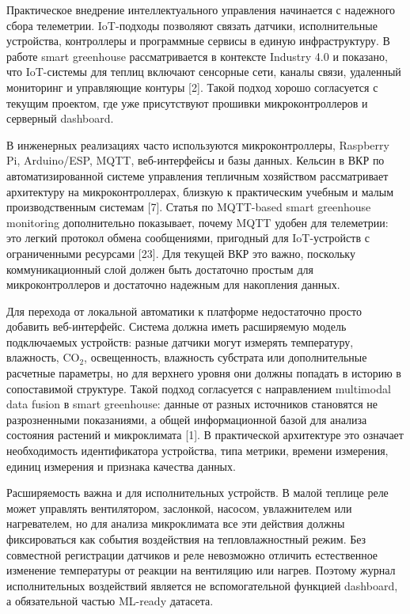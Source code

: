 \documentclass[a4paper,14pt]{extarticle}
\begin{document}
Практическое внедрение интеллектуального управления начинается с
надежного сбора телеметрии. IoT-подходы позволяют связать датчики,
исполнительные устройства, контроллеры и программные сервисы в единую
инфраструктуру. В работе smart greenhouse рассматривается в контексте
Industry 4.0 и показано, что IoT-системы для теплиц включают сенсорные
сети, каналы связи, удаленный мониторинг и управляющие контуры {[}2{]}.
Такой подход хорошо согласуется с текущим проектом, где уже присутствуют
прошивки микроконтроллеров и серверный dashboard.

В инженерных реализациях часто используются микроконтроллеры, Raspberry
Pi, Arduino/ESP, MQTT, веб-интерфейсы и базы данных. Кельсин в ВКР по
автоматизированной системе управления тепличным хозяйством рассматривает
архитектуру на микроконтроллерах, близкую к практическим учебным и малым
производственным системам {[}7{]}. Статья по MQTT-based smart greenhouse
monitoring дополнительно показывает, почему MQTT удобен для телеметрии:
это легкий протокол обмена сообщениями, пригодный для IoT-устройств с
ограниченными ресурсами {[}23{]}. Для текущей ВКР это важно, поскольку
коммуникационный слой должен быть достаточно простым для
микроконтроллеров и достаточно надежным для накопления данных.

Для перехода от локальной автоматики к платформе недостаточно просто
добавить веб-интерфейс. Система должна иметь расширяемую модель
подключаемых устройств: разные датчики могут измерять температуру,
влажность, CO\(_2\), освещенность, влажность субстрата или
дополнительные расчетные параметры, но для верхнего уровня они должны
попадать в историю в сопоставимой структуре. Такой подход согласуется с
направлением multimodal data fusion в smart greenhouse: данные от разных
источников становятся не разрозненными показаниями, а общей
информационной базой для анализа состояния растений и микроклимата
{[}1{]}. В практической архитектуре это означает необходимость
идентификатора устройства, типа метрики, времени измерения, единиц
измерения и признака качества данных.

Расширяемость важна и для исполнительных устройств. В малой теплице реле
может управлять вентилятором, заслонкой, насосом, увлажнителем или
нагревателем, но для анализа микроклимата все эти действия должны
фиксироваться как события воздействия на тепловлажностный режим. Без
совместной регистрации датчиков и реле невозможно отличить естественное
изменение температуры от реакции на вентиляцию или нагрев. Поэтому
журнал исполнительных воздействий является не вспомогательной функцией
dashboard, а обязательной частью ML-ready датасета.
\end{document}
